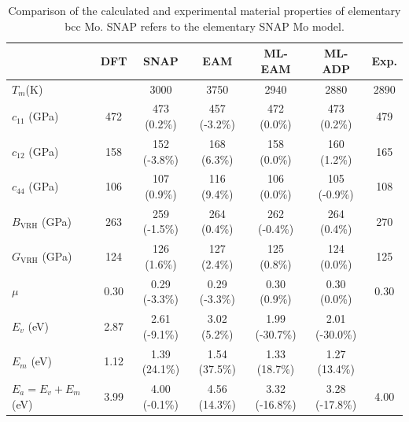 \documentclass[prb,reprint]{revtex4-2}
\begin{document}
% 
%
\begin{table}
\centering
\begin{tabular}{lcccccc}
\hline
                              & DFT  & SNAP \cite{SNAP_Mo} & EAM \cite{ZJW2} & ML-EAM         & ML-ADP         & Exp.                      \\
\hline
$T_{m}$(K)                    &      & 3000                & 3750            & 2940           & 2880           & 2890                      \\
$c_{11}$ (GPa)                & 472  & 473 (0.2\%)         & 457 (-3.2\%)    & 472 (0.0\%)    & 473 (0.2\%)    & 479 \cite{Mo_Elastic_Exp} \\
$c_{12}$ (GPa)                & 158  & 152 (-3.8\%)        & 168 (6.3\%)     & 158 (0.0\%)    & 160 (1.2\%)    & 165 \cite{Mo_Elastic_Exp} \\
$c_{44}$ (GPa)                & 106  & 107 (0.9\%)         & 116 (9.4\%)     & 106 (0.0\%)    & 105 (-0.9\%)   & 108 \cite{Mo_Elastic_Exp} \\
$B_{\mathrm{VRH}}$ (GPa)      & 263  & 259 (-1.5\%)        & 264 (0.4\%)     & 262 (-0.4\%)   & 264 (0.4\%)    & 270 \cite{Mo_Elastic_Exp} \\
$G_{\mathrm{VRH}}$ (GPa)      & 124  & 126 (1.6\%)         & 127 (2.4\%)     & 125 (0.8\%)    & 124 (0.0\%)    & 125 \cite{Mo_Elastic_Exp} \\
$\mu$                         & 0.30 & 0.29 (-3.3\%)       & 0.29 (-3.3\%)   & 0.30 (0.9\%)   & 0.30 (0.0\%)   & 0.30                      \\
$E_{v}$ (eV)                  & 2.87 & 2.61 (-9.1\%)       & 3.02 (5.2\%)    & 1.99 (-30.7\%) & 2.01 (-30.0\%) &                           \\
$E_{m}$ (eV)                  & 1.12 & 1.39 (24.1\%)       & 1.54 (37.5\%)   & 1.33 (18.7\%)  & 1.27 (13.4\%)  &                           \\
$E_{a} = E_{v} + E_{m} $ (eV) & 3.99 & 4.00 (-0.1\%)       & 4.56 (14.3\%)   & 3.32 (-16.8\%) & 3.28 (-17.8\%) & 4.00 \cite{Mo_Ea_Exp}     \\
\hline
\end{tabular}
\caption{\label{table:Mo_properties} Comparison of the calculated and 
experimental material properties of elementary bcc Mo. SNAP refers to the 
elementary SNAP Mo model.
}
\end{table}
\end{document}
